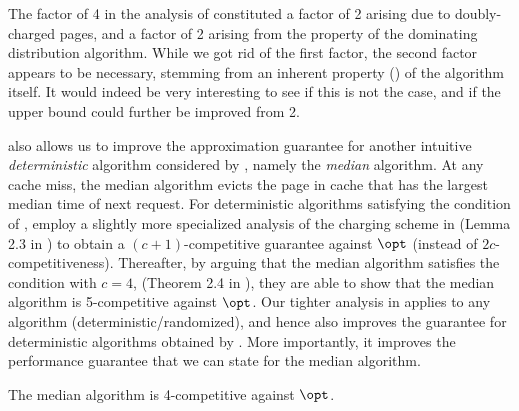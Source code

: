 \begin{remark}
    \label{remark:2-correct-answer-for-dom}
    The factor of 4 in the analysis of \cite{lund1994ip} constituted a factor of 2 arising due to doubly-charged pages, and a factor of 2 arising from the property of the dominating distribution algorithm. While we got rid of the first factor, the second factor appears to be necessary, stemming from an inherent property () of the algorithm itself. It would indeed be very interesting to see if this is not the case, and if the upper bound could further be improved from 2.
\end{remark}

 also allows us to improve the approximation guarantee for another intuitive \textit{deterministic} algorithm considered by \cite{lund1999paging}, namely the \textit{median} algorithm. At any cache miss, the median algorithm evicts the page in cache that has the largest median time of next request. For deterministic algorithms satisfying the condition of , \cite{lund1999paging} employ a slightly more specialized analysis of the charging scheme in  (Lemma 2.3 in \cite{lund1999paging}) to obtain a $(c+1)$-competitive guarantee against $\opt$ (instead of $2c$-competitiveness). Thereafter, by arguing that the median algorithm satisfies the condition with $c=4$, (Theorem 2.4 in \cite{lund1999paging}), they are able to show that the median algorithm is 5-competitive against $\opt$. Our tighter analysis in  applies to any algorithm (deterministic/randomized), and hence also improves the guarantee for deterministic algorithms obtained by \cite{lund1999paging}. More importantly, it improves the performance guarantee that we can state for the median algorithm.

\begin{corollary}
    \label{corollary:median-is-4-competitive}
    The median algorithm is 4-competitive against $\opt$.
\end{corollary}
